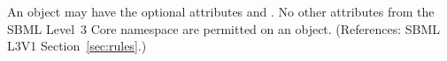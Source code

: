 An \AlgebraicRule object may have the optional attributes 
and .  No other attributes from the SBML Level~3 Core
namespace are permitted on an \AlgebraicRule object.  (References: SBML
L3V1 Section~\ref{sec:rules}.)
